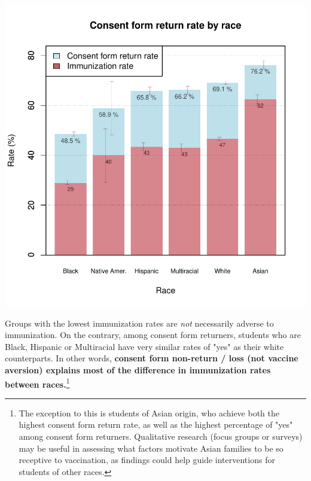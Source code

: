 \documentclass{article}
\begin{document}
\begin{multicols}{2}
\begin{multicols}{2}
\begin{center}
\includegraphics{superintendent-004}
\end{center}

Groups with the lowest immunization rates are \emph{not} necessarily adverse to immunization.  On the contrary, among consent form returners, students who are Black, Hispanic or Multiracial have very similar rates of "yes" as their white counterparts.  In other words, \textbf{consent form non-return / loss (not vaccine aversion) explains most of the difference in immunization rates between races.}\footnote{The exception to this is students of Asian origin, who achieve both the highest consent form return rate, as well as the highest percentage of "yes" among consent form returners.  Qualitative research (focus groups or surveys) may be useful in assessing what factors motivate Asian families to be so receptive to vaccination, as findings could help guide interventions for students of other races.}


\end{multicols}
\end{multicols}
\end{document}
